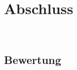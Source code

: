 %



\chapter{Abschluss}
\label{Kapitel:Abschluss}

~\\



\section{Bewertung}
\label{Abschnitt:Abschluss:Bewertung}







